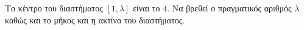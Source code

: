 Το κέντρο του διαστήματος $ [1,\lambda] $ είναι το $ 4 $. Να βρεθεί ο πραγματικός αριθμός $ \lambda $ καθώς και το μήκος και η ακτίνα του διαστήματος.

